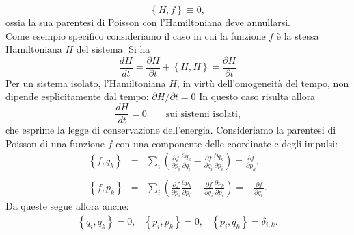 \begin{equation}
\left\lbrace H,f \right\rbrace  \equiv 0 ,
\end{equation}
ossia la sua parentesi di Poisson con l'Hamiltoniana deve annullarsi.\\
Come esempio specifico consideriamo il caso in cui la funzione $f$ \`e la stessa Hamiltoniana $H$ del sistema. Si ha
\begin{equation}
\frac{d H}{d t} = \frac{\partial H}{\partial t} + \left\lbrace H,H \right\rbrace = \frac{\partial H}{\partial t}
\end{equation}
Per un sistema isolato, l'Hamiltoniana $H$, in virt\`u dell'omogeneit\`a del tempo, non dipende esplicitamente dal tempo: $\partial H/ \partial t=0$ In questo caso risulta allora
\begin{equation}
\frac{d H}{d t} = 0 \qquad \textrm{sui sistemi isolati,}
\end{equation}
che esprime la legge di conservazione dell'energia.
Consideriamo la parentesi di Poisson di una funzione $f$ con una componente delle coordinate e degli impulsi:
\begin{eqnarray}
\left\lbrace f,q_k \right\rbrace &=& \sum_i \left( \frac{\partial f}{\partial p_i} \frac{\partial q_k}{\partial q_i} - \frac{\partial f}{\partial q_i}\frac{\partial q_k}{\partial p_i} \right) = \frac{\partial f}{\partial p_k} ,\\
\nonumber \\
\left\lbrace f,p_k \right\rbrace &=& \sum_i \left( \frac{\partial f}{\partial p_i} \frac{\partial p_k}{\partial p_i} - \frac{\partial f}{\partial q_i}\frac{\partial p_k}{\partial p_i} \right) = - \frac{\partial f}{\partial q_k} .
\end{eqnarray}
Da queste segue allora anche:
\begin{equation}
\begin{matrix}
\left\lbrace q_i,q_k \right\rbrace =0 , &  \left\lbrace p_i,p_k \right\rbrace =0 , & \left\lbrace p_i,q_k \right\rbrace = \delta_{i,k} .
\end{matrix}
\end{equation}

